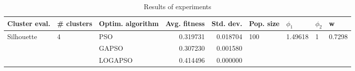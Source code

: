 \begin{table}
\centering
\caption{Results of experiments}
\begin{tabular}{lllrrllll}
\toprule
              Cluster eval. &        \# clusters & Optim. algorithm &  Avg. fitness &  Std. dev. &            Pop. size &               $\phi_{1}$ &         $\phi_{2}$ &                       w \\
\midrule
\multirow{3}{*}{Silhouette} & \multirow{3}{*}{4} &              PSO &      0.319731 &   0.018704 & \multirow{3}{*}{100} & \multirow{3}{*}{1.49618} & \multirow{3}{*}{1} & \multirow{3}{*}{0.7298} \\
                            &                    &            GAPSO &      0.307230 &   0.001580 &                      &                          &                    &                         \\
                            &                    &          LOGAPSO &      0.414496 &   0.000000 &                      &                          &                    &                         \\
\bottomrule
\end{tabular}
\end{table}
